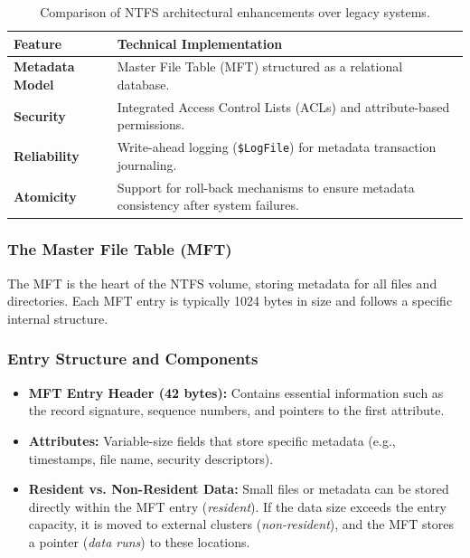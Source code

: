 \begin{table}[H]
\centering
\small
\begin{tabular}{|p{3cm}|p{7cm}|}
\hline
\textbf{Feature} & \textbf{Technical Implementation} \\
\hline
\textbf{Metadata Model} & Master File Table (MFT) structured as a relational database. \\
\hline
\textbf{Security} & Integrated Access Control Lists (ACLs) and attribute-based permissions. \\
\hline
\textbf{Reliability} & Write-ahead logging (\texttt{\$LogFile}) for metadata transaction journaling. \\
\hline
\textbf{Atomicity} & Support for roll-back mechanisms to ensure metadata consistency after system failures. \\
\hline
\end{tabular}
\caption{Comparison of NTFS architectural enhancements over legacy systems.}
\end{table}

\subsubsection{The Master File Table (MFT)}
The MFT is the heart of the NTFS volume, storing metadata for all files and directories. Each MFT entry is typically 1024 bytes in size and follows a specific internal structure.

\subsubsection*{Entry Structure and Components}
\begin{itemize}
    \item \textbf{MFT Entry Header (42 bytes):} Contains essential information such as the record signature, sequence numbers, and pointers to the first attribute.
    \item \textbf{Attributes:} Variable-size fields that store specific metadata (e.g., timestamps, file name, security descriptors).
    \item \textbf{Resident vs. Non-Resident Data:} Small files or metadata can be stored directly within the MFT entry (\textit{resident}). If the data size exceeds the entry capacity, it is moved to external clusters (\textit{non-resident}), and the MFT stores a pointer (\textit{data runs}) to these locations.
\end{itemize}

